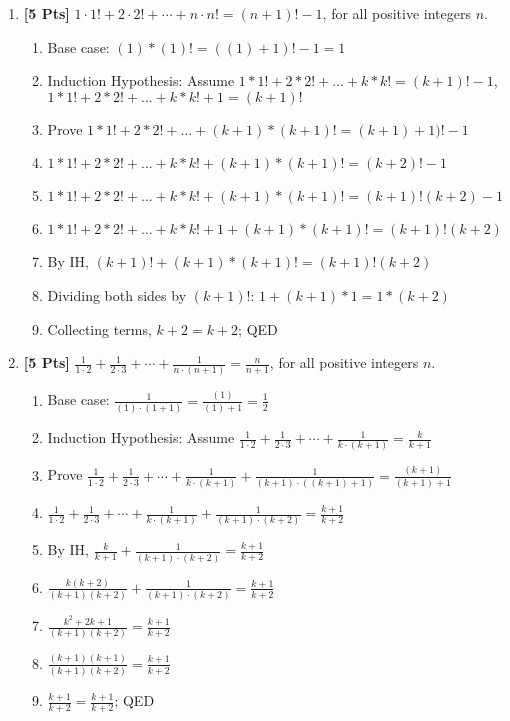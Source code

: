 \begin{enumerate}
        \item {\bf [5 Pts]} $1 \cdot 1! + 2 \cdot 2! + \cdots + n \cdot n! = (n+1)! - 1$, for all positive integers $n$.
        \begin{enumerate}
            \item Base case: $(1)*(1)! = ((1) + 1)! - 1 = 1$
            \item Induction Hypothesis: Assume $1*1! + 2*2! + ... + k*k! = (k + 1)! - 1$, $1*1! + 2*2! + ... + k*k! + 1 = (k + 1)!$
            \item Prove $1*1! + 2*2! + ... + (k + 1)*(k + 1)! = (k + 1) + 1)! - 1$
            \item $1*1! + 2*2! + ... + k*k! + (k + 1)*(k + 1)! = (k + 2)! - 1$
            \item $1*1! + 2*2! + ... + k*k! + (k + 1)*(k + 1)! = (k + 1)!(k + 2) - 1$
            \item $1*1! + 2*2! + ... + k*k! + 1 + (k + 1)*(k + 1)! = (k + 1)!(k + 2)$
            \item By IH, $(k + 1)! + (k + 1)*(k + 1)! = (k + 1)!(k + 2)$
            \item Dividing both sides by $(k + 1)!$: $1 + (k + 1)*1 = 1*(k + 2)$
            \item Collecting terms, $k + 2 = k + 2$; QED
        \end{enumerate}
\newpage
        \item {\bf [5 Pts]} $\frac{1}{1\cdot 2}+ \frac{1}{2\cdot 3} +\cdots +\frac{1}{n\cdot (n+1)} = \frac{n}{n+1}$, for all positive integers $n$.
        \begin{enumerate}
            \item Base case: $\frac{1}{(1)\cdot (1 + 1)} = \frac{(1)}{(1) + 1} = \frac{1}{2}$
            \item Induction Hypothesis: Assume $\frac{1}{1\cdot 2}+ \frac{1}{2\cdot 3} +\cdots +\frac{1}{k\cdot (k+1)} = \frac{k}{k+1}$
            \item Prove $\frac{1}{1\cdot 2}+ \frac{1}{2\cdot 3} +\cdots +\frac{1}{k\cdot (k+1)} +\frac{1}{(k + 1)\cdot ((k + 1)+1)} = \frac{(k + 1)}{(k + 1)+1}$
            \item $\frac{1}{1\cdot 2}+ \frac{1}{2\cdot 3} +\cdots +\frac{1}{k\cdot (k+1)} +\frac{1}{(k + 1)\cdot (k + 2)} = \frac{k + 1}{k + 2}$
            \item By IH, $\frac{k}{k+1} +\frac{1}{(k + 1)\cdot (k + 2)} = \frac{k + 1}{k + 2}$
            \item $\frac{k(k + 2)}{(k + 1)(k + 2)} +\frac{1}{(k + 1)\cdot (k + 2)} = \frac{k + 1}{k + 2}$
            \item $\frac{k^2 + 2k + 1}{(k + 1)(k + 2)} = \frac{k + 1}{k + 2}$
            \item $\frac{(k + 1)(k + 1)}{(k + 1)(k + 2)} = \frac{k + 1}{k + 2}$
            \item $\frac{k + 1}{k + 2} = \frac{k + 1}{k + 2}$; QED
        \end{enumerate}


\end{enumerate}
